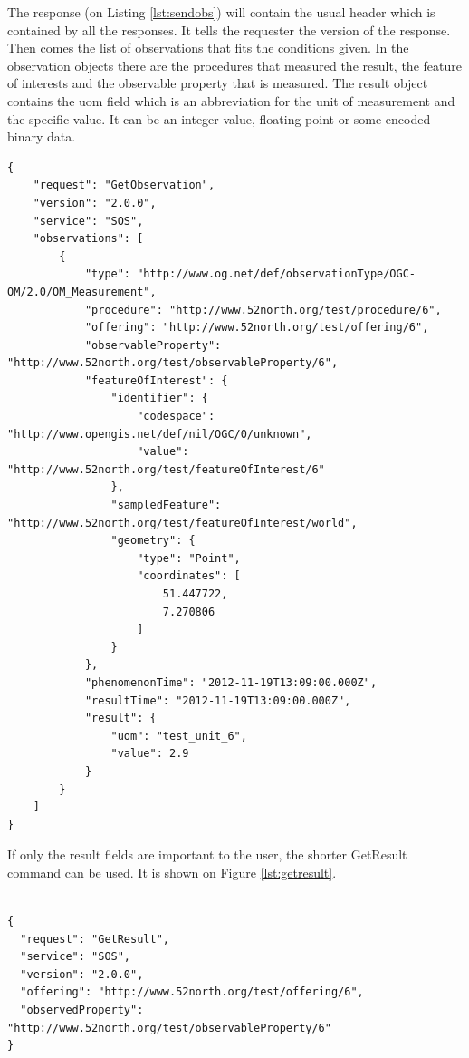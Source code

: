 The response (on Listing \ref{lst:sendobs}) will contain the usual header which is contained by all the responses. It tells the requester the version of the response. Then comes the list of observations that fits the conditions given. In the observation objects there are the procedures that measured the result, the feature of interests and the observable property that is measured. The result object contains the uom field which is an abbreviation for the unit of measurement and the specific value. It can be an integer value, floating point or some encoded binary data.

\begin{lstlisting}[caption={JSON GetObservation response\label{lst:sendobs}}]
{
    "request": "GetObservation",
    "version": "2.0.0",
    "service": "SOS",
    "observations": [
        {
            "type": "http://www.og.net/def/observationType/OGC-OM/2.0/OM_Measurement",
            "procedure": "http://www.52north.org/test/procedure/6",
            "offering": "http://www.52north.org/test/offering/6",
            "observableProperty": "http://www.52north.org/test/observableProperty/6",
            "featureOfInterest": {
                "identifier": {
                    "codespace": "http://www.opengis.net/def/nil/OGC/0/unknown",
                    "value": "http://www.52north.org/test/featureOfInterest/6"
                },
                "sampledFeature": "http://www.52north.org/test/featureOfInterest/world",
                "geometry": {
                    "type": "Point",
                    "coordinates": [
                        51.447722,
                        7.270806
                    ]
                }
            },
            "phenomenonTime": "2012-11-19T13:09:00.000Z",
            "resultTime": "2012-11-19T13:09:00.000Z",
            "result": {
                "uom": "test_unit_6",
                "value": 2.9
            }
        }
    ]
}
\end{lstlisting}

If only the result fields are important to the user, the shorter GetResult command can be used. It is shown on Figure \ref{lst:getresult}.

\begin{lstlisting}[caption={JSON minimal GetResult POST request\label{lst:getresult}}]

{
  "request": "GetResult",
  "service": "SOS",
  "version": "2.0.0",
  "offering": "http://www.52north.org/test/offering/6",
  "observedProperty": "http://www.52north.org/test/observableProperty/6"
}
\end{lstlisting}

